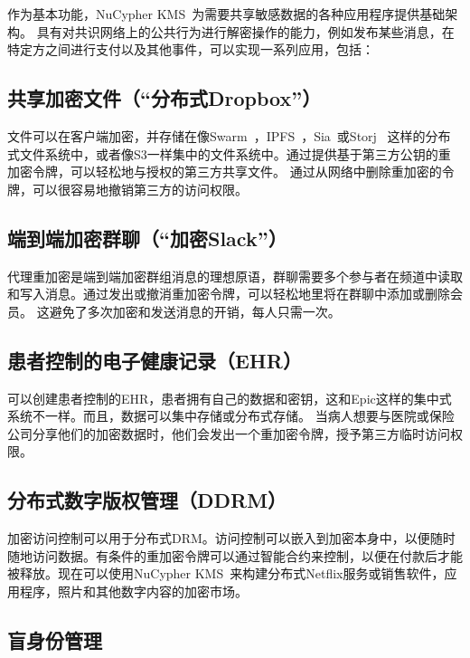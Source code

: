 \documentclass[longbibliography,nofootinbib]{revtex4-1}
\newcommand{\kms}{NuCypher KMS}
\begin{document}
\begin{CJK*}{UTF8}{gbsn}
	作为基本功能，\kms~为需要共享敏感数据的各种应用程序提供基础架构。 具有对共识网络上的公共行为进行解密操作的能力，例如发布某些消息，在特定方之间进行支付以及其他事件，可以实现一系列应用，包括：

\subsection{共享加密文件（“分布式Dropbox”）}
\label{sec:files}

	文件可以在客户端加密，并存储在像Swarm~\cite{swarm}，IPFS~\cite{whitepaper:ipfs}，Sia~\cite{web:sia}或Storj ~\cite{web:storj}这样的分布式文件系统中，或者像S3一样集中的文件系统中。通过提供基于第三方公钥的重加密令牌，可以轻松地与授权的第三方共享文件。 通过从网络中删除重加密的令牌，可以很容易地撤销第三方的访问权限。

\subsection{端到端加密群聊（“加密Slack”）}

    代理重加密是端到端加密群组消息的理想原语，群聊需要多个参与者在频道中读取和写入消息。通过发出或撤消重加密令牌，可以轻松地里将在群聊中添加或删除会员。 这避免了多次加密和发送消息的开销，每人只需一次。

\subsection{患者控制的电子健康记录（EHR）}

    可以创建患者控制的EHR，患者拥有自己的数据和密钥，这和Epic这样的集中式系统不一样。而且，数据可以集中存储或分布式存储。 当病人想要与医院或保险公司分享他们的加密数据时，他们会发出一个重加密令牌，授予第三方临时访问权限。

\subsection{分布式数字版权管理（DDRM）}
\label{sec:drm}

	加密访问控制可以用于分布式DRM。访问控制可以嵌入到加密本身中，以便随时随地访问数据。有条件的重加密令牌可以通过智能合约来控制，以便在付款后才能被释放。现在可以使用\kms~来构建分布式Netflix服务或销售软件，应用程序，照片和其他数字内容的加密市场。

\subsection{盲身份管理}


\end{CJK*}
\end{document}
